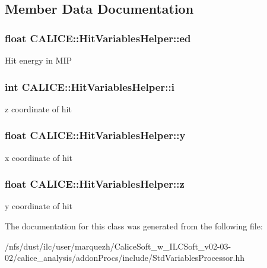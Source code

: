 \subsection{Member Data Documentation}
\subsubsection[{ed}]{\setlength{\rightskip}{0pt plus 5cm}float C\-A\-L\-I\-C\-E\-::\-Hit\-Variables\-Helper\-::ed}\label{classCALICE_1_1HitVariablesHelper_a35727510e97c1dd701fea88c3ba904e2}
Hit energy in M\-I\-P 
\subsubsection[{i}]{\setlength{\rightskip}{0pt plus 5cm}int C\-A\-L\-I\-C\-E\-::\-Hit\-Variables\-Helper\-::i}\label{classCALICE_1_1HitVariablesHelper_acb9a17f11b5a12239442a578a3c4a291}
z coordinate of hit 
\subsubsection[{y}]{\setlength{\rightskip}{0pt plus 5cm}float C\-A\-L\-I\-C\-E\-::\-Hit\-Variables\-Helper\-::y}\label{classCALICE_1_1HitVariablesHelper_aab35727991db77ab4351f1ff6c52adb7}
x coordinate of hit 
\subsubsection[{z}]{\setlength{\rightskip}{0pt plus 5cm}float C\-A\-L\-I\-C\-E\-::\-Hit\-Variables\-Helper\-::z}\label{classCALICE_1_1HitVariablesHelper_a3aab7bbe9eb3b633153308e2134ebcdb}
y coordinate of hit 

The documentation for this class was generated from the following file\-:\begin{DoxyCompactItemize}
\item 
/nfs/dust/ilc/user/marquezh/\-Calice\-Soft\-\_\-w\-\_\-\-I\-L\-C\-Soft\-\_\-v02-\/03-\/02/calice\-\_\-analysis/addon\-Procs/include/Std\-Variables\-Processor.\-hh\end{DoxyCompactItemize}
